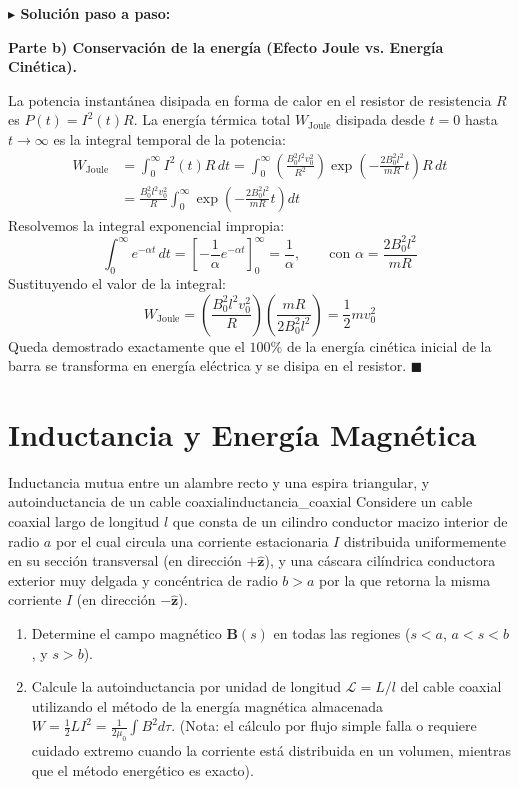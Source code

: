 \documentclass[11pt,a4paper]{book}
\newenvironment{solucion}{%
    \par\medskip\noindent\textbf{\color{blue!65!black}\Large $\blacktriangleright$ Solución paso a paso:}\par\medskip
}{%
    \hfill$\blacksquare$\par\bigskip
}
\newcommand{\zhat}{\hat{\bm{z}}}
\newcommand{\Bvec}{\bm{B}}
\begin{document}
\begin{solucion}
\medskip
\textbf{Parte b) Conservación de la energía (Efecto Joule vs. Energía Cinética).}

La potencia instantánea disipada en forma de calor en el resistor de resistencia $R$ es $P(t) = I^2(t) R$. La energía térmica total $W_{\text{Joule}}$ disipada desde $t=0$ hasta $t \to \infty$ es la integral temporal de la potencia:
\begin{align}
    W_{\text{Joule}} &= \int_{0}^{\infty} I^2(t) R \, dt = \int_{0}^{\infty} \left(\frac{B_0^2 l^2 v_0^2}{R^2}\right) \exp\left(-\frac{2 B_0^2 l^2}{m R} t\right) R \, dt \nonumber \\
    &= \frac{B_0^2 l^2 v_0^2}{R} \int_{0}^{\infty} \exp\left(-\frac{2 B_0^2 l^2}{m R} t\right) dt
\end{align}
Resolvemos la integral exponencial impropia:
\begin{equation}
    \int_{0}^{\infty} e^{-\alpha t}\,dt = \left[ -\frac{1}{\alpha} e^{-\alpha t} \right]_{0}^{\infty} = \frac{1}{\alpha}, \qquad \text{con } \alpha = \frac{2 B_0^2 l^2}{m R}
\end{equation}
Sustituyendo el valor de la integral:
\begin{equation}
    W_{\text{Joule}} = \left(\frac{B_0^2 l^2 v_0^2}{R}\right) \left(\frac{m R}{2 B_0^2 l^2}\right) = \frac{1}{2} m v_0^2
\end{equation}
Queda demostrado exactamente que el $100\%$ de la energía cinética inicial de la barra se transforma en energía eléctrica y se disipa en el resistor.
\end{solucion}

\section{Inductancia y Energía Magnética}

\begin{ejercicio}{Inductancia mutua entre un alambre recto y una espira triangular, y autoinductancia de un cable coaxial}{inductancia_coaxial}
Considere un cable coaxial largo de longitud $l$ que consta de un cilindro conductor macizo interior de radio $a$ por el cual circula una corriente estacionaria $I$ distribuida uniformemente en su sección transversal (en dirección $+\zhat$), y una cáscara cilíndrica conductora exterior muy delgada y concéntrica de radio $b > a$ por la que retorna la misma corriente $I$ (en dirección $-\zhat$).
\begin{enumerate}[label=\alph*)]
    \item Determine el campo magnético $\Bvec(s)$ en todas las regiones ($s < a$, $a < s < b$, y $s > b$).
    \item Calcule la autoinductancia por unidad de longitud $\mathcal{L} = L/l$ del cable coaxial utilizando el método de la energía magnética almacenada $W = \frac{1}{2}LI^2 = \frac{1}{2\mu_0}\int B^2 d\tau$. (Nota: el cálculo por flujo simple falla o requiere cuidado extremo cuando la corriente está distribuida en un volumen, mientras que el método energético es exacto).
\end{enumerate}
\end{ejercicio}
\end{document}
